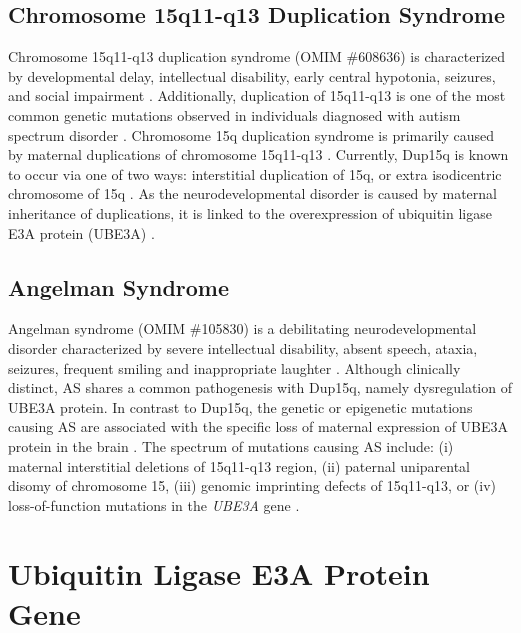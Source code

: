 \subsection{Chromosome 15q11-q13 Duplication Syndrome}

Chromosome 15q11-q13 duplication syndrome (OMIM \#608636) is characterized by developmental delay, intellectual disability, early central hypotonia, seizures, and social impairment \cite{Battaglia2008}. Additionally, duplication of 15q11-q13 is one of the most common genetic mutations observed in individuals diagnosed with autism spectrum disorder \cite{Battaglia2008,Bolton2001,Cook1997,Nurmi2001,Schroer1998}. Chromosome 15q duplication syndrome is primarily caused by maternal duplications of chromosome 15q11-q13 \cite{Battaglia2008,Browne1997}. Currently, Dup15q is known to occur via one of two ways:
interstitial duplication of 15q,
or extra isodicentric chromosome of 15q \cite{Battaglia2008,Klei2012}. As the neurodevelopmental disorder is caused by maternal inheritance of duplications, it is linked to the overexpression of ubiquitin ligase E3A protein (UBE3A) \cite{Nurmi2001}.

\subsection{Angelman Syndrome}

Angelman syndrome (OMIM \#105830) is a debilitating neurodevelopmental disorder characterized by severe intellectual disability, absent speech, ataxia, seizures, frequent smiling and inappropriate laughter \cite{Williams2006}. Although clinically distinct, AS shares a common pathogenesis with Dup15q, namely dysregulation of UBE3A protein. In contrast to Dup15q, the genetic or epigenetic mutations causing AS are associated with the specific loss of maternal expression of UBE3A protein in the brain \cite{Kishino1997,Matsuura1997,Williams2006}. The spectrum of mutations causing AS include:
(i) maternal interstitial deletions of 15q11-q13 region,
(ii) paternal uniparental disomy of chromosome 15,
(iii) genomic imprinting defects of 15q11-q13, or
(iv) loss-of-function mutations in the \textit{UBE3A} gene \cite{Williams2006}.

\section{Ubiquitin Ligase E3A Protein Gene}

